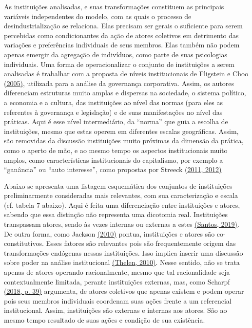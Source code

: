 As instituições analisadas, e suas transformações constituem as
principais variáveis independentes do modelo, com as quais o processo de
desindustrialização se relaciona. Elas precisam ser gerais o suficiente
para serem percebidas como condicionantes da ação de atores coletivos em
detrimento das variações e preferências individuais de seus membros.
Elas também não podem apenas emergir da agregação de indivíduos, como
parte de suas psicologias individuais. Uma forma de operacionalizar o
conjunto de instituições a serem analisadas é trabalhar com a proposta
de níveis institucionais de Fligstein e Choo
\href{https://www.zotero.org/google-docs/?Zva7nh}{(2005)}, utilizada
para a análise da governança corporativa. Assim, os autores diferenciam
estruturas muito amplas e dispersas na sociedade, o sistema político, a
economia e a cultura, das instituições ao nível das normas (para eles as
referentes à governança e legislação) e de suas manifestações no nível
das práticas. Aqui é esse nível intermediário, da ``norma'' que guia a
escolha de instituições, mesmo que estas operem em diferentes escalas
geográficas. Assim, são removidas da discussão instituições muito
próximas da dimensão da prática, como o aperto de mão, e ao mesmo tempo
os aspectos institucionais muito amplos, como características
institucionais do capitalismo, por exemplo a ``ganância'' ou ``auto
interesse'', como propostas por Streeck
\href{https://www.zotero.org/google-docs/?f8Vwi2}{(2011, 2012)}

Abaixo se apresenta uma listagem esquemática dos conjuntos de
instituições preliminarmente consideradas mais relevantes, com sua
caracterização e escala (cf. tabela 7 abaixo). Aqui é feita uma
diferenciação entre instituições e atores, sabendo que essa distinção
não representa uma dicotomia real. Instituições transpassam atores,
sendo às vezes internas ou externas a estes
\href{https://www.zotero.org/google-docs/?G1ZSKg}{(Santos, 2019)}. De
outra forma, como Jackson
\href{https://www.zotero.org/google-docs/?tGZ5l2}{(2010)} pontua,
instituições e atores são co-constitutivos. Esses fatores são relevantes
pois são frequentemente origem das transformações endógenas nessas
instituições. Isso implica inserir uma discussão sobre poder na análise
institucional \href{https://www.zotero.org/google-docs/?vcSXWj}{(Thelen,
2010)}. Nesse sentido, não se trata apenas de atores operando
racionalmente, mesmo que tal racionalidade seja contextualmente
limitada, perante instituições externas, mas, como Scharpf
\href{https://www.zotero.org/google-docs/?gWAa6k}{(2018, p. 39)}
argumenta, de atores coletivos que apenas existem e podem operar pois
seus membros individuais coordenam suas ações frente a um referencial
institucional. Assim, instituições são externas e internas aos atores.
São ao mesmo tempo resultado de suas ações e condição de sua existência.

